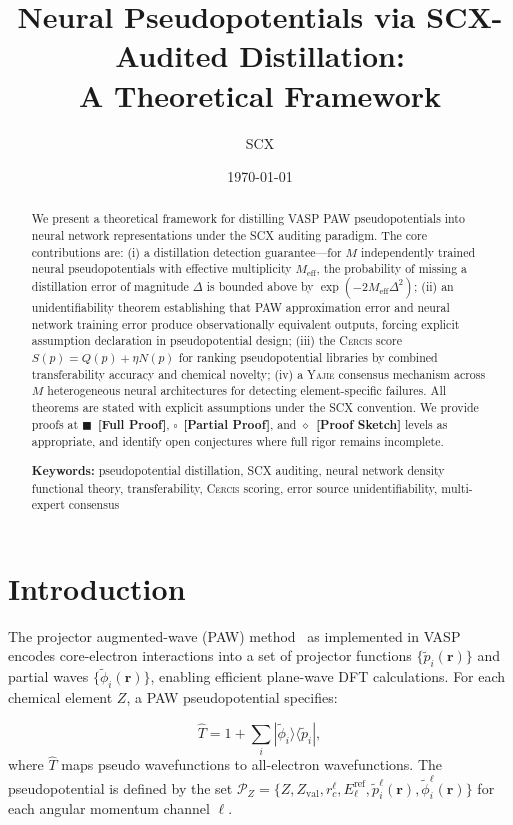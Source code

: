 \documentclass[11pt,a4paper]{article}
\title{Neural Pseudopotentials via SCX-Audited Distillation:\\
A Theoretical Framework}
\author{SCX}
\date{\today}
\theoremstyle{definition}
\newcommand{\rigorFull}[0]{$\blacksquare$~\textbf{[Full Proof]}}
\newcommand{\rigorPartial}[0]{$\square$~\textbf{[Partial Proof]}}
\newcommand{\rigorSketch}[0]{$\diamond$~\textbf{[Proof Sketch]}}
\newcommand{\Yajie}{\textsc{Yajie}}
\newcommand{\Cercis}{\textsc{Cercis}}
\newcommand{\SCX}{\textsc{SCX}}
\begin{document}
\maketitle

\begin{abstract}
We present a theoretical framework for distilling VASP PAW pseudopotentials into neural network representations under the \SCX{} auditing paradigm. The core contributions are: (i) a distillation detection guarantee—for $M$ independently trained neural pseudopotentials with effective multiplicity $M_{\mathrm{eff}}$, the probability of missing a distillation error of magnitude $\Delta$ is bounded above by $\exp(-2M_{\mathrm{eff}}\Delta^2)$; (ii) an unidentifiability theorem establishing that PAW approximation error and neural network training error produce observationally equivalent outputs, forcing explicit assumption declaration in pseudopotential design; (iii) the \Cercis{} score $S(p) = Q(p) + \eta N(p)$ for ranking pseudopotential libraries by combined transferability accuracy and chemical novelty; (iv) a \Yajie{} consensus mechanism across $M$ heterogeneous neural architectures for detecting element-specific failures. All theorems are stated with explicit assumptions under the \SCX{} convention. We provide proofs at \rigorFull, \rigorPartial, and \rigorSketch{} levels as appropriate, and identify open conjectures where full rigor remains incomplete.

\medskip
\noindent\textbf{Keywords:} pseudopotential distillation, SCX auditing, neural network density functional theory, transferability, \Cercis{} scoring, error source unidentifiability, multi-expert consensus
\end{abstract}

\section{Introduction}

The projector augmented-wave (PAW) method~\cite{Blochl1994,Kresse1999} as implemented in VASP~\cite{Kresse1996a,Kresse1996b} encodes core-electron interactions into a set of projector functions $\{\tilde{p}_i(\mathbf{r})\}$ and partial waves $\{\tilde{\phi}_i(\mathbf{r})\}$, enabling efficient plane-wave DFT calculations. For each chemical element $Z$, a PAW pseudopotential specifies:

\begin{equation}\label{eq:paw_def}
\hat{T} = 1 + \sum_{i} |\tilde{\phi}_i\rangle \langle \tilde{p}_i|,
\end{equation}
where $\hat{T}$ maps pseudo wavefunctions to all-electron wavefunctions. The pseudopotential is defined by the set $\mathcal{P}_Z = \{Z, Z_{\mathrm{val}}, r_c^\ell, E_\ell^{\mathrm{ref}}, \tilde{p}_i^\ell(\mathbf{r}), \tilde{\phi}_i^\ell(\mathbf{r})\}$ for each angular momentum channel $\ell$.
\end{document}

